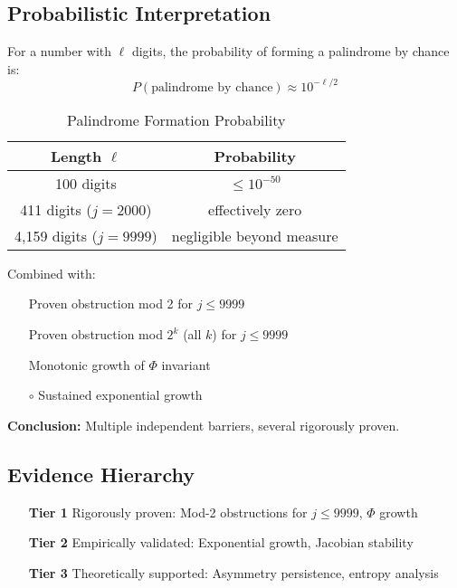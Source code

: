\documentclass[11pt,a4paper]{article}
\theoremstyle{plain}
\theoremstyle{definition}
\newcommand{\cmark}{\ding{51}}
\begin{document}
\subsection{Probabilistic Interpretation}

For a number with $\ell$ digits, the probability of forming a palindrome by chance is:
\begin{equation}
P(\text{palindrome by chance}) \approx 10^{-\ell/2}
\end{equation}

\begin{table}[h]
\centering
\caption{Palindrome Formation Probability}
\label{tab:palindrome_probability}
\begin{tabular}{@{}cc@{}}
\toprule
\textbf{Length $\ell$} & \textbf{Probability} \\
\midrule
100 digits & $\leq 10^{-50}$ \\
411 digits ($j=2000$) & effectively zero \\
4,159 digits ($j=9999$) & negligible beyond measure \\
\bottomrule
\end{tabular}
\end{table}

Combined with:
\begin{itemize}
\item[\textcolor{proven}{\cmark}] Proven obstruction mod 2 for $j \leq 9999$
\item[\textcolor{proven}{\cmark}] Proven obstruction mod $2^k$ (all $k$) for $j \leq 9999$
\item[\textcolor{proven}{\cmark}] Monotonic growth of $\Phi$ invariant
\item[\textcolor{observed}{$\circ$}] Sustained exponential growth
\end{itemize}

\textbf{Conclusion:} Multiple independent barriers, several rigorously proven.

\subsection{Evidence Hierarchy}
\begin{enumerate}
\item[\textbf{Tier 1}] Rigorously proven: Mod-2 obstructions for $j \leq 9999$, $\Phi$ growth
\item[\textbf{Tier 2}] Empirically validated: Exponential growth, Jacobian stability
\item[\textbf{Tier 3}] Theoretically supported: Asymmetry persistence, entropy analysis
\end{enumerate}
\end{document}
